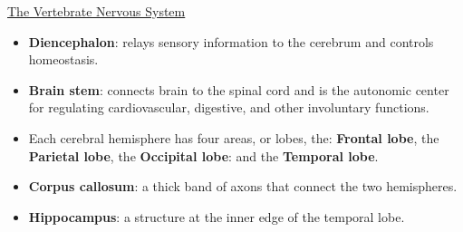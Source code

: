 \documentclass[12pt,letterpaper]{article}
\begin{document}
\begin{secbox}{\hyperlink{43}{The Vertebrate Nervous System}}
{\begin{itemize}
\begin{itemize}
                \item \textbf{Diencephalon}: relays sensory information to the cerebrum and controls homeostasis.
                \item \textbf{Brain stem}: connects brain to the spinal cord and is the autonomic center for regulating cardiovascular, digestive, and other involuntary functions.
                \item Each cerebral hemisphere has four areas, or lobes, the: \textbf{Frontal lobe}, the \textbf{Parietal lobe}, the \textbf{Occipital lobe}: and the \textbf{Temporal lobe}.
                \item \textbf{Corpus callosum}: a thick band of axons that connect the two hemispheres.
                \item \textbf{Hippocampus}: a structure at the inner edge of the temporal lobe. 
            \end{itemize}
    \end{itemize}

}
\end{secbox}
\end{document}
